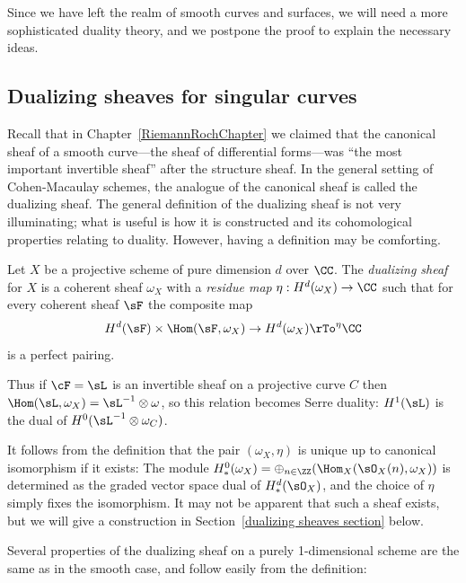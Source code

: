 Since we have left the realm of smooth curves and surfaces, we will need a more sophisticated duality theory, and we
postpone the proof to explain the necessary ideas.



\subsection*{Dualizing sheaves for singular curves}

Recall that in Chapter~\ref{RiemannRochChapter} we claimed that the canonical sheaf of a smooth curve---the sheaf of differential forms---was ``the most important invertible sheaf'' after the structure sheaf. In the general setting of Cohen-Macaulay schemes, the analogue of the canonical sheaf is called the dualizing sheaf.
The general definition of the dualizing sheaf is not very illuminating; what is useful is how it is constructed and its cohomological properties relating to duality.
However, having a definition may be comforting. 

\begin{definition}
Let $X$ be a projective scheme  of pure dimension $d$ over $\CC$. The \emph{dualizing sheaf} for $X$ is a coherent sheaf $\omega_X$ 
\label{dualizing sheaf for singular curve}
with a \emph{residue map} $\eta: H^d(\omega_X) \to \CC$ such that for every coherent sheaf  $\sF$ the composite map
$$
H^d(\sF) \times \Hom(\sF, \omega_X) \to H^d(\omega_X) \rTo^\eta \CC
$$
is a perfect pairing. 
\end{definition}

Thus if $\cF = \sL$ is an invertible sheaf on a projective curve $C$ then $\Hom(\sL, \omega_X) = \sL^{-1}\otimes \omega$,
so this relation becomes Serre duality: $H^{1}(\sL)$ is the dual of $H^{0}(\sL^{-1}\otimes \omega_{C})$.

It follows from the definition that the pair $(\omega_{X}, \eta)$ is unique up to canonical isomorphism if it exists:
The module $H^{0}_{*}(\omega_{X}) = \oplus_{n\in \ZZ}(\Hom_{X}(\sO_{X}(n), \omega_{X}))$
is determined as the graded vector space dual of $H^{d}_{*}(\sO_{X})$, and the choice of $\eta$ simply fixes the isomorphism. It may not be apparent that such a sheaf exists, but we will give a construction in Section~\ref{dualizing sheaves section} below.
 
 Several properties of the dualizing sheaf on a purely 1-dimensional scheme
are the same as in the smooth case, and follow easily from the definition:

